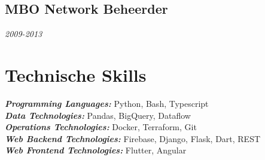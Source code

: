 \documentclass{article}
\begin{document}
\subsection{MBO Network Beheerder}\hfill {\em 2009-2013} \\

\section{Technische Skills}
{\sl \textbf{Programming Languages:}} Python, Bash, Typescript \\
{\sl \textbf{Data Technologies:}} Pandas, BigQuery, Dataflow \\
{\sl \textbf{Operations Technologies:}} Docker, Terraform, Git \\
{\sl \textbf{Web Backend Technologies:}} Firebase, Django, Flask, Dart, REST \\
{\sl \textbf{Web Frontend Technologies:}} Flutter, Angular \\
\end{document}
